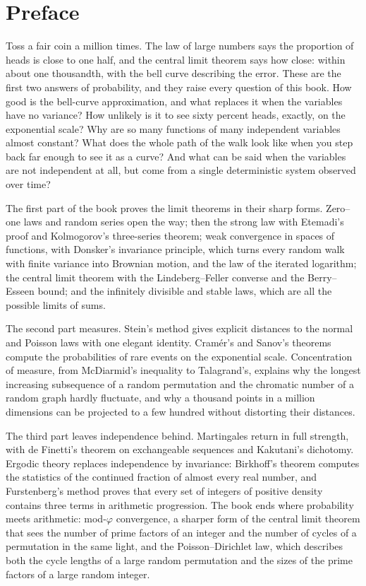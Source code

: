 \chapter*{Preface}
Toss a fair coin a million times. The law of large numbers says the proportion of heads is close to one half, and the central
limit theorem says how close: within about one thousandth, with the bell curve describing the error. These are the first two
answers of probability, and they raise every question of this book. How good is the bell-curve approximation, and what
replaces it when the variables have no variance? How unlikely is it to see sixty percent heads, exactly, on the exponential
scale? Why are so many functions of many independent variables almost constant? What does the whole path of the walk look like
when you step back far enough to see it as a curve? And what can be said when the variables are not independent at all, but
come from a single deterministic system observed over time?

The first part of the book proves the limit theorems in their sharp forms. Zero--one laws and random series open the way;
then the strong law with Etemadi's proof and Kolmogorov's three-series theorem; weak convergence in spaces of functions, with
Donsker's invariance principle, which turns every random walk with finite variance into Brownian motion, and the law of the
iterated logarithm; the central limit theorem with the Lindeberg--Feller converse and the Berry--Esseen bound; and the
infinitely divisible and stable laws, which are all the possible limits of sums.

The second part measures. Stein's method gives explicit distances to the normal and Poisson laws with one elegant identity.
Cram\'er's and Sanov's theorems compute the probabilities of rare events on the exponential scale. Concentration of measure,
from McDiarmid's inequality to Talagrand's, explains why the longest increasing subsequence of a random permutation and the
chromatic number of a random graph hardly fluctuate, and why a thousand points in a million dimensions can be projected to a
few hundred without distorting their distances.

The third part leaves independence behind. Martingales return in full strength, with de Finetti's theorem on exchangeable
sequences and Kakutani's dichotomy. Ergodic theory replaces independence by invariance: Birkhoff's theorem computes the
statistics of the continued fraction of almost every real number, and Furstenberg's method proves that every set of integers
of positive density contains three terms in arithmetic progression. The book ends where probability meets arithmetic:
mod-$\varphi$ convergence, a sharper form of the central limit theorem that sees the number of prime factors of an integer and
the number of cycles of a permutation in the same light, and the Poisson--Dirichlet law, which describes both the cycle
lengths of a large random permutation and the sizes of the prime factors of a large random integer.

